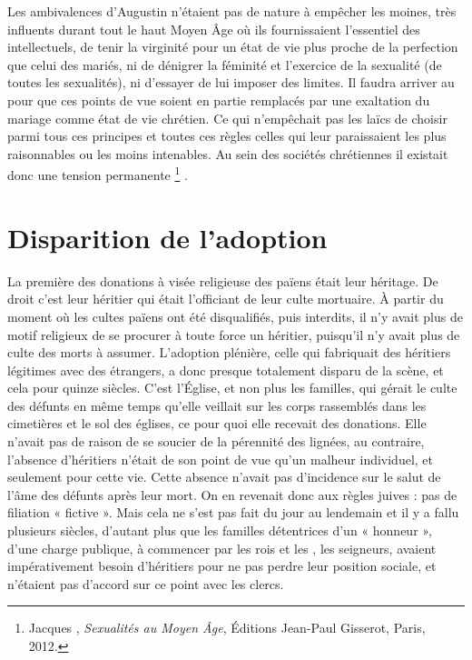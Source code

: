  Les ambivalences d'Augustin n'étaient pas de nature à empêcher les moines, très influents durant tout le haut Moyen Âge où ils fournissaient l'essentiel des intellectuels, de tenir la virginité pour un état de vie plus proche de la perfection que celui des mariés, ni de dénigrer la féminité et l'exercice de la sexualité (de toutes les sexualités), ni d'essayer de lui imposer des limites. Il faudra arriver au  pour que ces points de vue soient en partie remplacés par une exaltation du mariage comme état de vie chrétien. Ce qui n'empêchait pas les laïcs de choisir parmi tous ces principes et toutes ces règles celles qui leur paraissaient les plus raisonnables ou les moins intenables. Au sein des sociétés chrétiennes il existait donc une tension permanente%
\footnote{Jacques , \emph{Sexualités au Moyen Âge}, Éditions Jean-Paul Gisserot, Paris, 2012.}%
. 
 

\section{Disparition de l'adoption}

 La première des donations à visée religieuse des païens était leur héritage. De droit c'est leur héritier qui était l'officiant de leur culte mortuaire. À partir du moment où les cultes païens ont été disqualifiés, puis interdits, il n'y avait plus de motif religieux de se procurer à toute force un héritier, puisqu'il n'y avait plus de culte des morts à assumer. L'adoption plénière, celle qui fabriquait des héritiers légitimes avec des étrangers, a donc presque totalement disparu de la scène, et cela pour quinze siècles. C'est l'Église, et non plus les familles, qui gérait le culte des défunts en même temps qu'elle veillait sur les corps rassemblés dans les cimetières et le sol des églises, ce pour quoi elle recevait des donations. Elle n'avait pas de raison de se soucier de la pérennité des lignées, au contraire, l'absence d'héritiers n'était de son point de vue qu'un malheur individuel, et seulement pour cette vie. Cette absence n'avait pas d'incidence sur le salut de l'âme des défunts après leur mort. On en revenait donc aux règles juives : pas de filiation « fictive ». Mais cela ne s'est pas fait du jour au lendemain et il y a fallu plusieurs siècles, d'autant plus que les familles détentrices d'un « honneur », d'une charge publique, à commencer par les rois et les , les seigneurs, avaient impérativement besoin d'héritiers pour ne pas perdre leur position sociale, et n'étaient pas d'accord sur ce point avec les clercs. 


